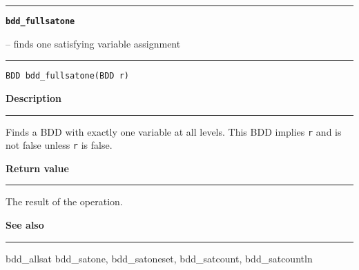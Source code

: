 \begin{minipage}{\textwidth}

\noindent\begin{minipage}{\textwidth}
\rule{\textwidth}{0.5mm}
{\tt\bf bdd\_fullsatone }
\--- finds one satisfying variable assignment  \hspace{\fill}
\\\rule[1.5ex]{\textwidth}{0.5mm}
\end{minipage}

\noindent\begin{verbatim}
BDD bdd_fullsatone(BDD r) 
\end{verbatim}

\vspace{\parsep}\noindent
{\bf Description}\\\rule[1.5ex]{\textwidth}{0.2mm}\vspace{-1.5ex}\setlength{\parindent}{1em}
Finds a BDD with exactly one variable at all levels. This BDD
           implies {\tt r} and is not false unless {\tt r} is
	   false. 

\setlength{\parindent}{0em}\vspace{\parsep}\vspace{\baselineskip}\noindent
{\bf Return value}\\\rule[1.5ex]{\textwidth}{0.2mm}\vspace{-1.5ex}
The result of the operation. 

\vspace{\parsep}\vspace{\baselineskip}\noindent
{\bf See also}\\\rule[1.5ex]{\textwidth}{0.2mm}\vspace{-1.5ex}
bdd\_allsat bdd\_satone, bdd\_satoneset, bdd\_satcount, bdd\_satcountln 
\end{minipage}
\vspace{8ex}
